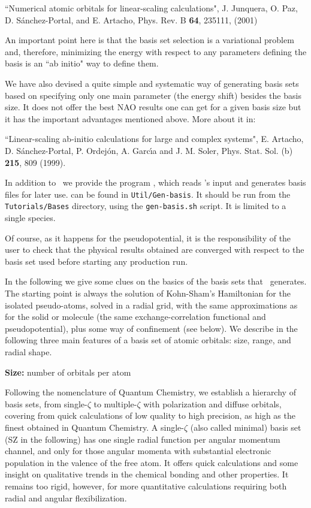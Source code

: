 \noindent
``Numerical atomic orbitals for linear-scaling calculations",
J. Junquera, O. Paz, D. S\'anchez-Portal, and E. Artacho, Phys. Rev. B
\textbf{64}, 235111, (2001)

An important point here is that the basis set selection is a
variational problem and, therefore, minimizing the energy with respect
to any parameters defining the basis is an ``ab initio" way to
define them.

We have also devised a quite simple and systematic way of generating
basis sets based on specifying only one main parameter (the energy shift)
besides the basis size. It does not offer the best NAO results one can get
for a given basis size but it has the important advantages mentioned above.
More about it in:

\noindent
``Linear-scaling ab-initio calculations for large and complex systems",
E. Artacho, D. S\'anchez-Portal, P. Ordej\'on, A. Garc\'{\i}a and
J. M. Soler, Phys. Stat. Sol. (b) \textbf{215}, 809 (1999).

In addition to \siesta\ we provide the program 
, which reads \siesta's input and
generates basis files for later use.  can be found
in \texttt{Util/Gen-basis}. 
It should be run from the \texttt{Tutorials/Bases} directory,
using the \texttt{gen-basis.sh} script. It is limited to a single species.

Of course, as it happens for the pseudopotential, it is the
responsibility of the user to check that the physical results obtained
are converged with respect to the basis set used before starting any
production run.

In the following we give some clues on the basics of the basis sets
that \siesta\ generates.
  The starting point is always the solution of Kohn-Sham's Hamiltonian
for the isolated pseudo-atoms, solved in a radial grid,
with the same approximations as for the solid or molecule
(the same exchange-correlation functional and  pseudopotential),
plus some way of confinement (see below).
  We describe in the following three main features of a
basis set of atomic orbitals: size, range, and radial shape.

\textbf{Size:} number of orbitals per atom

  Following the nomenclature of Quantum Chemistry, we establish
a hierarchy of basis sets, from single-$\zeta$ to multiple-$\zeta$
with polarization and diffuse orbitals, covering from quick calculations
of low quality to high precision, as high as the finest obtained in
Quantum Chemistry.
  A single-$\zeta$ (also called minimal) basis set (SZ in the following)
has one single radial function per angular momentum channel, and only for
those angular momenta with substantial electronic population in the valence of
the free atom.
  It offers quick calculations and some insight on qualitative trends
in the chemical bonding and other properties.
  It remains too rigid, however, for more quantitative calculations
requiring both radial and angular flexibilization.

